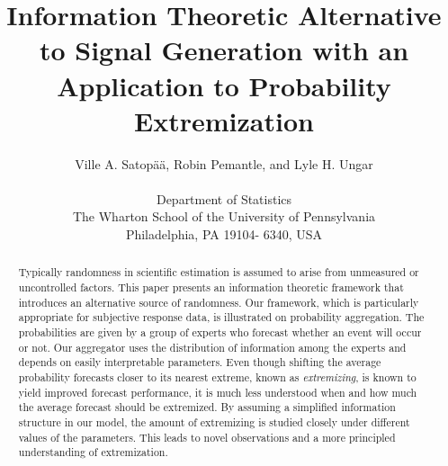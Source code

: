 \documentclass[11pt,twoside]{article}
\begin{document}
\title{Information Theoretic Alternative to Signal Generation with an Application to Probability Extremization}
\author{
Ville A. Satop\"a\"a, Robin Pemantle, and Lyle H. Ungar\\
\\
 \small Department of Statistics\\
 \small The Wharton School of the University of Pennsylvania\\
 \small Philadelphia, PA 19104- 6340, USA\\ [-0.25in]} \date{}
\maketitle

\pagestyle{myheadings}
\thispagestyle{empty}

\begin{abstract}
Typically randomness in scientific estimation is assumed to arise from unmeasured or uncontrolled factors. This paper presents an information theoretic framework that introduces an alternative source of randomness. Our framework, which is particularly appropriate for subjective response data, is illustrated on probability aggregation. The probabilities are given by a group of experts who forecast whether an event will occur or not. Our aggregator uses the distribution of information among the experts and depends on easily interpretable parameters. Even though shifting the average probability forecasts closer to its nearest extreme, known as \textit{extremizing}, is known to yield improved forecast performance, it is much less understood when and how much the average forecast should be extremized. By assuming a simplified information structure in our model, the amount of extremizing is studied closely under different values of  the parameters. This leads to novel observations and a more principled understanding of extremization.
\end{abstract}

\end{document}
